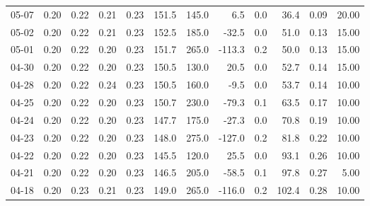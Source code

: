 \begin{threeparttable}
{\begin{tabular}{lrrrrrrrrrrr}
  05-07 &          0.20 &          0.22 &          0.21 &        0.23 &               151.5 &               145.0 &        6.5 &                 0.0 &             36.4 &            0.09 &                  20.00 \\
  05-02 &          0.20 &          0.22 &          0.21 &        0.23 &               152.5 &               185.0 &      -32.5 &                 0.0 &             51.0 &            0.13 &                  15.00 \\
  05-01 &          0.20 &          0.22 &          0.20 &        0.23 &               151.7 &               265.0 &     -113.3 &                 0.2 &             50.0 &            0.13 &                  15.00 \\
  04-30 &          0.20 &          0.22 &          0.20 &        0.23 &               150.5 &               130.0 &       20.5 &                 0.0 &             52.7 &            0.14 &                  15.00 \\
  04-28 &          0.20 &          0.22 &          0.24 &        0.23 &               150.5 &               160.0 &       -9.5 &                 0.0 &             53.7 &            0.14 &                  10.00 \\
  04-25 &          0.20 &          0.22 &          0.20 &        0.23 &               150.7 &               230.0 &      -79.3 &                 0.1 &             63.5 &            0.17 &                  10.00 \\
  04-24 &          0.20 &          0.22 &          0.20 &        0.23 &               147.7 &               175.0 &      -27.3 &                 0.0 &             70.8 &            0.19 &                  10.00 \\
  04-23 &          0.20 &          0.22 &          0.20 &        0.23 &               148.0 &               275.0 &     -127.0 &                 0.2 &             81.8 &            0.22 &                  10.00 \\
  04-22 &          0.20 &          0.22 &          0.20 &        0.23 &               145.5 &               120.0 &       25.5 &                 0.0 &             93.1 &            0.26 &                  10.00 \\
  04-21 &          0.20 &          0.22 &          0.20 &        0.23 &               146.5 &               205.0 &      -58.5 &                 0.1 &             97.8 &            0.27 &                   5.00 \\
  04-18 &          0.20 &          0.23 &          0.21 &        0.23 &               149.0 &               265.0 &     -116.0 &                 0.2 &            102.4 &            0.28 &                  10.00 \\

\end{tabular}}
\end{threeparttable}
